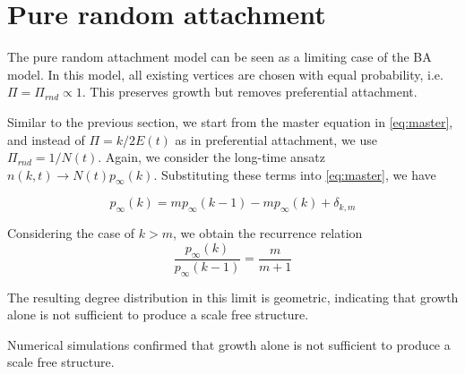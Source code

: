 \section{Pure random attachment}\label{section:pure-random-attachment}

The pure random attachment model can be seen as a limiting case of the BA model. In this model, all existing vertices are chosen with equal probability, i.e. $\Pi = \Pi_{rnd} \propto 1$. This preserves growth but removes preferential attachment. 

Similar to the previous section, we start from the master equation in \autoref{eq:master}, and instead of $\Pi = k/ 2E(t)$ as in preferential attachment, we use $\Pi_{rnd} = 1 / N(t)$. Again, we consider the long-time ansatz $n(k, t) \rightarrow N(t) p_{\infty}(k)$. Substituting these terms into \autoref{eq:master}, we have

\begin{equation}
	p_{\infty}(k) = m p_{\infty}(k-1) - m p_{\infty}(k) + \delta_{k, m} 
	\label{eq:pra-degree-distribution-p-infinity}
\end{equation}

Considering the case of $k > m$, we obtain the recurrence relation
\begin{equation}
	\frac{p_{\infty}(k)}{p_{\infty}(k-1)} = \frac{m}{m+1}
\end{equation} 



The resulting degree distribution in this limit is geometric, indicating that growth alone is not sufficient to produce a scale free structure. 

Numerical simulations confirmed that growth alone is not sufficient to produce a scale free structure. 
